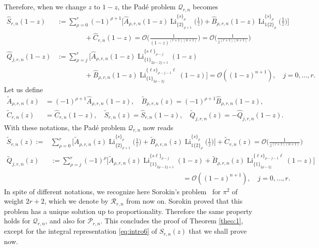 \documentclass[reqno,12pt]{amsart}
\numberwithin{equation}{section}
\theoremstyle{remark}
\def\li{\operatorname{Li}}
\newcommand{\Prn}{\mathcal{P}_{r,n}}
\newcommand{\Qrn}{\mathcal{Q}_{r,n}}
\newcommand{\soro}{\mathcal{R}_{r,n}}
\begin{document}
Therefore, when we change $z$ to $1-z$, the Pad\'e problem  $\mathcal{Q}_{r,n}$  becomes
\begin{align*}
\widehat{S}_{r,n}(1-z)&
:= \sum_{\rho=0}^r(-1)^{\rho+1} \bigg[\widehat{A}_{\rho,r,n}(1-z) \li_{\{2\}_{\rho+1}}^{\{s\}_\rho}\bigg(\frac1z\bigg) 
 +\widehat{B}_{\rho,r,n}(1-z) \li_{1\{2\}_{\rho}}^{\{s\}_\rho}\bigg(\frac1z\bigg)  \bigg] 
\\
&\qquad\qquad
+ \widehat{C}_{r,n}(1-z) = \mathcal{O}\bigg(\frac{1}{(1-z)^{(r+1)(n+1)}}\bigg)
=\mathcal{O}\bigg(\frac{1}{z^{(r+1)(n+1)}}\bigg)
\\
\widehat{Q}_{j,r,n}(1-z)&:=\sum_{\rho=j}^r \bigg[\widehat{A}_{\rho,r,n}(1-z) \li_{\{1\}_{2\rho-2j+1}}^{\{s\ell\}_{\rho-j}}(1-z)
\\
& \qquad\qquad + \widehat{B}_{\rho,r,n}(1-z) 
\li_{\{1\}_{2\rho-2j}}^{\{\ell s\}_{\rho-j-1}\ell}(1-z) \bigg] =  \mathcal{O}((1-z)^{n+1}), \quad j=0, \ldots, r.
\end{align*}
Let us define
\begin{align*}
\widetilde{A}_{\rho,r,n}(z)&=(-1)^{\rho+1}\widehat{A}_{\rho,r,n}(1-z), \quad
\widetilde{B}_{\rho,r,n}(z)=(-1)^{\rho+1}\widehat{B}_{\rho,r,n}(1-z),
\\
\widetilde{C}_{r,n}(z)&=\widehat{C}_{r,n}(1-z), \quad
\widetilde{S}_{r,n}(z)=\widehat{S}_{r,n}(1-z), \quad
\widetilde{Q}_{j,r,n}(z)=-\widehat{Q}_{j,r,n}(1-z).
\end{align*}
With these notations, the Pad\'e problem  $\mathcal{Q}_{r,n}$ now reads
\begin{align*}
\widetilde{S}_{r,n}(z):=&\sum_{\rho=0}^r \bigg[\widetilde{A}_{\rho,r,n}(z)
\li_{\{2\}_{\rho+1}}^{\{s\}_\rho}\bigg(\frac1z\bigg) + \widetilde{B}_{\rho,r,n}(z)
\li_{1\{2\}_{\rho}}^{\{s\}_\rho}\bigg(\frac1z\bigg)\bigg] + \widetilde{C}_{r,n}(z) = \mathcal{O}\bigg(\frac{1}{z^{(r+1)(n+1)}}\bigg)
\\
\widetilde{Q}_{j,r,n}(z)&:=\sum_{\rho=j}^r (-1)^\rho\bigg[\widetilde{A}_{\rho,r,n}(z) \li_{\{1\}_{2\rho-2j+1}}^{\{s\ell\}_{\rho-j}}(1-z)
+ \widetilde{B}_{\rho,r,n}(z) \li_{\{1\}_{2\rho-2j}}^{\{\ell s\}_{\rho-j-1}\ell}(1-z) \bigg]
\\ &\hspace{8cm}=  \mathcal{O}((1-z)^{n+1}), \quad j=0, \ldots, r.
\end{align*}
In spite of different notations, we recognize here Sorokin's problem~\cite{sorokin1} 
for $\pi^2$ of weight $2r+2$,  which we denote by $\soro$ from now on. 
Sorokin proved that this problem has a unique solution up to proportionality. Therefore the same 
property holds for $\Qrn$, and also for $\Prn$. This concludes the proof of Theorem \ref{theo:1}, 
except for the integral representation \eqref{eq:intro6}  of $S_{r,n}(z)$ that we shall prove now.
\end{document}
